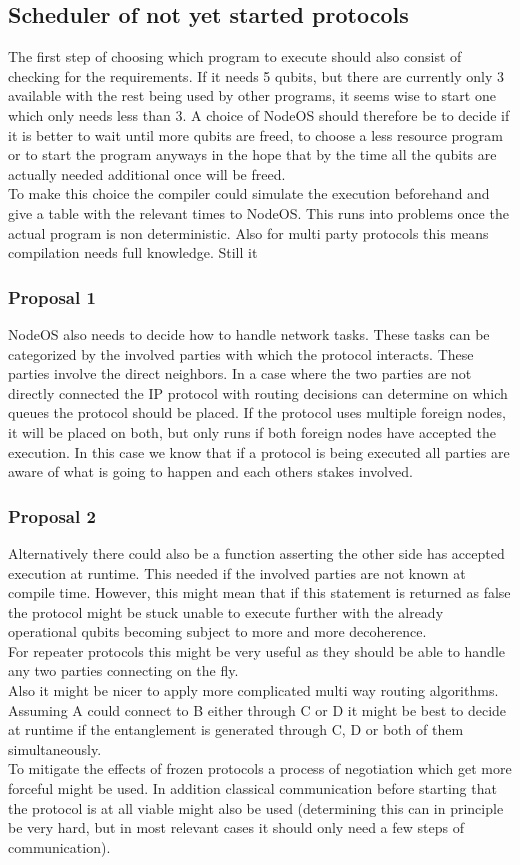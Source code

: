 \documentclass[]{article}
\begin{document}
\subsection{Scheduler of not yet started protocols}
The first step of choosing which program to execute should also consist of checking for the requirements. If it needs 5 qubits, but there are currently only 3 available with the rest being used by other programs, it seems wise to start one which only needs less than 3. A choice of NodeOS should therefore be to decide if it is better to wait until more qubits are freed, to choose a less resource program or to start the program anyways in the hope that by the time all the qubits are actually needed additional once will be freed. \\
To make this choice the compiler could simulate the execution beforehand and give a table with the relevant times to NodeOS. This runs into problems once the actual program is non deterministic. Also for multi party protocols this means compilation needs full knowledge. Still it 
\subsubsection{Proposal 1}
NodeOS also needs to decide how to handle network tasks. These tasks can be categorized by the involved parties with which the protocol interacts. These parties involve the direct neighbors. In a case where the two parties are not directly connected the IP protocol with routing decisions can determine on which queues the protocol should be placed. If the protocol uses multiple foreign nodes, it will be placed on both, but only runs if both foreign nodes have accepted the execution. In this case we know that if a protocol is being executed all parties are aware of what is going to happen and each others stakes involved.

\subsubsection{Proposal 2}
Alternatively there could also be a function asserting the other side has accepted execution at runtime. This needed if the involved parties are not known at compile time. However, this might mean that if this statement is returned as false the protocol might be stuck unable to execute further with the already operational qubits becoming subject to more and more decoherence.\\
For repeater protocols this might be very useful as they should be able to handle any two parties connecting on the fly. \\ 
Also it might be nicer to apply more complicated multi way routing algorithms. Assuming A could connect to B either through C or D it might be best to decide at runtime if the entanglement is generated through C, D or both of them simultaneously. \\
To mitigate the effects of frozen protocols a process of negotiation which get more forceful might be used. In addition classical communication before starting that the protocol is at all viable might also be used (determining this can in principle be very hard, but in most relevant cases it should only need a few steps of communication).
\end{document}
